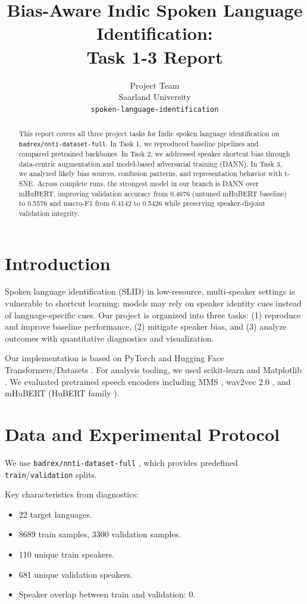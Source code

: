 \documentclass[11pt]{article}
\title{Bias-Aware Indic Spoken Language Identification:\\Task 1-3 Report}
\author{Project Team \\
Saarland University \\
\texttt{spoken-language-identification}}
\begin{document}
\maketitle

\begin{abstract}
This report covers all three project tasks for Indic spoken language identification on \texttt{badrex/nnti-dataset-full}. In Task 1, we reproduced baseline pipelines and compared pretrained backbones. In Task 2, we addressed speaker shortcut bias through data-centric augmentation and model-based adversarial training (DANN). In Task 3, we analyzed likely bias sources, confusion patterns, and representation behavior with t-SNE. Across complete runs, the strongest model in our branch is DANN over mHuBERT, improving validation accuracy from 0.4676 (untuned mHuBERT baseline) to 0.5576 and macro-F1 from 0.4142 to 0.5426 while preserving speaker-disjoint validation integrity.
\end{abstract}

\section{Introduction}
Spoken language identification (SLID) in low-resource, multi-speaker settings is vulnerable to shortcut learning: models may rely on speaker identity cues instead of language-specific cues. Our project is organized into three tasks: (1) reproduce and improve baseline performance, (2) mitigate speaker bias, and (3) analyze outcomes with quantitative diagnostics and visualization.

Our implementation is based on PyTorch \citep{paszke2019pytorch} and Hugging Face Transformers/Datasets \citep{wolf2020transformers}. For analysis tooling, we used scikit-learn \citep{pedregosa2011scikit} and Matplotlib \citep{hunter2007matplotlib}. We evaluated pretrained speech encoders including MMS \citep{pratap2023mms}, wav2vec 2.0 \citep{baevski2020wav2vec2}, and mHuBERT (HuBERT family \citep{hsu2021hubert}).

\section{Data and Experimental Protocol}
We use \texttt{badrex/nnti-dataset-full} \citep{badr2026dataset}, which provides predefined \texttt{train}/\texttt{validation} splits.

Key characteristics from diagnostics:
\begin{itemize}
    \item 22 target languages.
    \item 8689 train samples, 3300 validation samples.
    \item 110 unique train speakers.
    \item 681 unique validation speakers.
    \item Speaker overlap between train and validation: 0.
\end{itemize}
\end{document}
